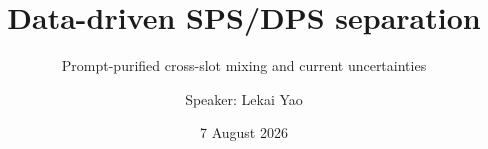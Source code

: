 \title[Data-driven SPS/DPS]{Data-driven SPS/DPS separation}
\subtitle{Prompt-purified cross-slot mixing and current uncertainties}
\author{Speaker: Lekai Yao}
\institute{}
\date{7 August 2026}
